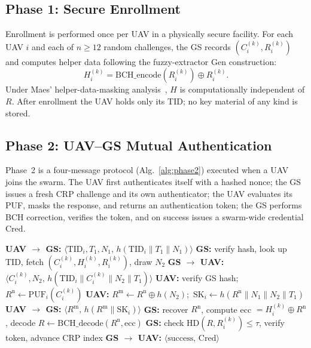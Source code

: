 \documentclass[conference,a4paper,10pt]{IEEEtran}
\begin{document}
\subsection{Phase 1: Secure Enrollment}
Enrollment is performed once per UAV in a physically secure facility.
For each UAV $i$ and each of $n{\ge}12$ random challenges, the GS
records $(C_i^{(k)}, R_i^{(k)})$ and computes helper data following
the fuzzy-extractor Gen construction:
\begin{equation}
H_i^{(k)} = \mathrm{BCH\_encode}(R_i^{(k)}) \oplus R_i^{(k)}.
\label{eq:gen}
\end{equation}
Under Maes' helper-data-masking analysis~\cite{helper_data_masking},
$H$ is computationally independent of $R$. After enrollment the UAV
holds only its TID; no key material of any kind is stored.

\subsection{Phase 2: UAV--GS Mutual Authentication}
Phase~2 is a four-message protocol (Alg.~\ref{alg:phase2}) executed
when a UAV joins the swarm. The UAV first authenticates itself with
a hashed nonce; the GS issues a fresh CRP challenge and its own
authenticator; the UAV evaluates its PUF, masks the response, and
returns an authentication token; the GS performs BCH correction,
verifies the token, and on success issues a swarm-wide credential
$\mathrm{Cred}$.

\begin{algorithm}[t]
\caption{Phase 2 UAV--GS Mutual Authentication}
\label{alg:phase2}
\begin{algorithmic}[1]
\STATE \textbf{UAV $\to$ GS:} $\langle \mathrm{TID}_i, T_1, N_1,\,
  h(\mathrm{TID}_i\|T_1\|N_1) \rangle$
\STATE \textbf{GS:} verify hash, look up TID, fetch
  $(C_i^{(k)}, H_i^{(k)}, R_i^{(k)})$, draw $N_2$
\STATE \textbf{GS $\to$ UAV:} $\langle C_i^{(k)}, N_2,\,
  h(\mathrm{TID}_i\|C_i^{(k)}\|N_2\|T_1) \rangle$
\STATE \textbf{UAV:} verify GS hash; $R^{\mathrm{n}} \leftarrow
  \mathrm{PUF}_i(C_i^{(k)})$
\STATE \textbf{UAV:} $R^{\mathrm{m}} \leftarrow R^{\mathrm{n}}\oplus
  h(N_2)$;\ $\mathrm{SK}_i \leftarrow
  h(R^{\mathrm{n}}\|N_1\|N_2\|T_1)$
\STATE \textbf{UAV $\to$ GS:} $\langle R^{\mathrm{m}},\,
  h(R^{\mathrm{m}}\|\mathrm{SK}_i) \rangle$
\STATE \textbf{GS:} recover $R^{\mathrm{n}}$, compute ecc
  $= H_i^{(k)}\oplus R^{\mathrm{n}}$, decode $R \leftarrow
  \mathrm{BCH\_decode}(R^{\mathrm{n}},\mathrm{ecc})$
\STATE \textbf{GS:} check $\mathrm{HD}(R, R_i^{(k)}){\le}\tau$,
  verify token, advance CRP index
\STATE \textbf{GS $\to$ UAV:} $\langle \mathrm{success},\,
  \mathrm{Cred} \rangle$
\end{algorithmic}
\end{algorithm}
\end{document}
